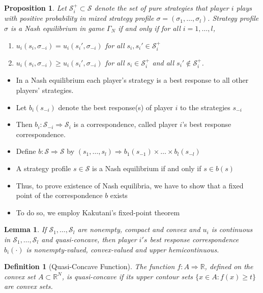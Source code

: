 \documentclass[12pt]{extreport} %
\theoremstyle{named}
\theoremstyle{itshape}
\newtheorem*{definition}{Definition}
\theoremstyle{normal}
\newtheorem{lemma}[unnamedtheorem]{Lemma}
\newtheorem{proposition}[unnamedtheorem]{Proposition}
\begin{document}
\begin{proposition} 
	Let $\mathcal{S}_{i}^{+} \subset \mathcal{S}$ denote the set of pure strategies that player $i$ plays with positive probability in mixed strategy profile $\sigma = (\sigma_1, \dotsc, \sigma_l)$. Strategy profile $\sigma$ is a Nash equilibrium in game $\Gamma_N$ if and only if for all $i = 1, \dotsc, l$,
	\begin{enumerate}
		\item $u_i(s_i, \sigma_{-i}) = u_i(s_i', \sigma_{-i})$ for all $s_i, s_i' \in \mathcal{S}_i^+$
		\item $u_i(s_i, \sigma_{-i}) \geq u_i(s_i', \sigma_{-i})$ for all $s_i \in \mathcal{S}_i^+$ and all $s_i' \notin \mathcal{S}_i^+$.
	\end{enumerate}
\end{proposition} 
 
\begin{itemize}
	\item In a Nash equilibrium each player's strategy is a best response to all other players' strategies.
	\item Let $b_i(s_{-i})$ denote the best response(s) of player $i$ to the strategies $s_{-i}$
	\item Then $b_i \colon \mathcal{S}_{-i} \Rightarrow \mathcal{S}_i$ is a correspondence, called player $i$'s best response correspondence.
	\item Define $b \colon \mathcal{S} \Rightarrow \mathcal{S}$ by $(s_1, \dotsc, s_l) \Rightarrow b_1(s_{-1}) \times \dotsc \times b_l(s_{-l})$
	\item A strategy profile $s \in \mathcal{S}$ is a Nash equilibrium if and only if $s \in b(s)$
	\item Thus, to prove existence of Nash equilibria, we have to show that a fixed point of the correspondence $b$ exists
	\item To do so, we employ Kakutani's fixed-point theorem
\end{itemize} 
 
\begin{lemma}
	If $\mathcal{S}_1, \dotsc, \mathcal{S}_l$ are nonempty, compact and convex and $u_i$ is continuous in $\mathcal{S}_1, \dotsc, \mathcal{S}_l$ and quasi-concave, then player $i's$ best response correspondence $b_i(\cdot)$ is nonempty-valued, convex-valued and upper hemicontinuous.
\end{lemma} 
 
\begin{definition}[Quasi-Concave Function]
	The function $f \colon A \Rightarrow \mathbb{R}$, defined on the convex set $A \subset \mathbb{R}^N$, is quasi-concave if its upper contour sets $\{ x \in A \colon f(x) \geq t \}$ are convex sets.
\end{definition} 
 
\end{document}
